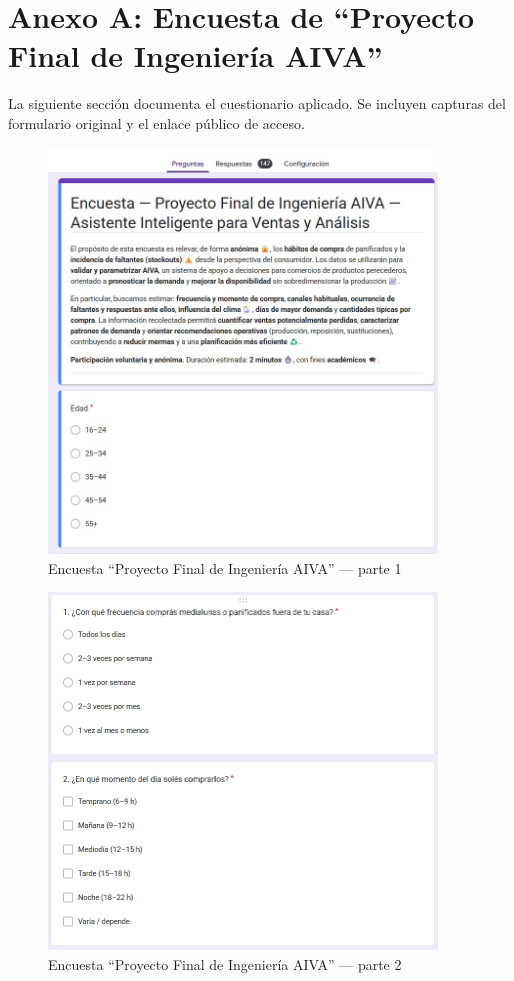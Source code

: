 
\section{Anexo A: Encuesta de “Proyecto Final de Ingeniería AIVA”}
La siguiente sección documenta el cuestionario aplicado. Se incluyen
capturas del formulario original y el enlace público de acceso.

\begin{figure}[p]
  \centering
  \includegraphics[width=0.92\textwidth]{images/encuesta_p1.png}
  \caption{Encuesta “Proyecto Final de Ingeniería AIVA” — parte 1}
  \label{fig:encuesta-aiva-1}
\end{figure}

\begin{figure}[p]
  \centering
  \includegraphics[width=0.92\textwidth]{images/encuesta_p2.png}
  \caption{Encuesta “Proyecto Final de Ingeniería AIVA” — parte 2}
  \label{fig:encuesta-aiva-2}
\end{figure}

